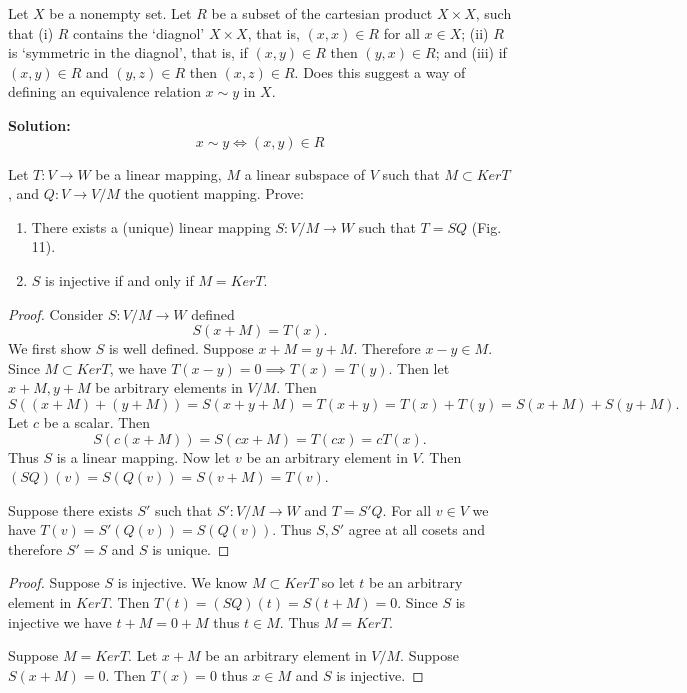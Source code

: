 \begin{tcolorbox}[title=Problem 6, breakable]
    Let $X$ be a nonempty set.
    Let $R$ be a subset of the cartesian product 
    $X \times X$, such that (i) $R$ contains the `diagnol'
    $X \times X$, that is, $(x, x) \in R$ 
    for all $x \in X$; (ii) $R$  is `symmetric in the diagnol',
    that is, if $(x, y) \in R$ then $(y, x) \in R$;
    and (iii) if $(x, y) \in R$ and $(y, z) \in R$ then 
    $(x, z) \in R$. Does this suggest a way of defining an equivalence
    relation $x \sim y$ in $X$.
\end{tcolorbox}

\textbf{Solution: } 
\[x \sim y \iff (x, y) \in R\]

\begin{tcolorbox}[title=Problem 7, breakable]
    Let $T : V \longrightarrow W$ be a linear mapping, $M$ a linear subspace of $V$ such that 
    $M \subset Ker T$, and $Q : V \longrightarrow V/M$ the quotient mapping. Prove:
    \begin{enumerate}
        \item There exists a (unique) linear mapping $S : V/M \longrightarrow W$ such that $T = SQ$ (Fig. 11).
        \item $S$ is injective if and only if $M = Ker T$.
    \end{enumerate}
\end{tcolorbox}

\begin{proof}
    Consider $S : V / M \longrightarrow W$ defined 
    \[
        S(x + M) = T(x).
    \]
    We first show $S$ is well defined. Suppose $x + M = y + M$.
    Therefore $x - y \in M$. Since $M \subset Ker T$,
    we have $T(x - y) = 0 \implies T(x) = T(y)$.
    Then let $x + M, y + M$ be arbitrary elements in $V/M$.
    Then 
    \[
        S((x + M) + (y + M)) = S(x + y + M) = T(x + y)
        = T(x) + T(y) = S(x + M) + S(y + M).
    \]
    Let $c$ be a scalar. Then 
    \[
        S(c(x + M)) = S(cx + M) = T(cx) = cT(x).
    \]
    Thus $S$ is a linear mapping.
    Now let $v$ be an arbitrary element in $V$.
    Then $(SQ)(v) = S(Q(v)) = S(v + M) = T(v)$.
    
    Suppose there exists $S'$ such that $S' : V/M \longrightarrow W$ and $T = S'Q$.
    For all $v \in V$ we have $T(v) = S'(Q(v)) = S(Q(v))$.
    Thus $S, S'$ agree at all cosets and therefore $S' = S$ and $S$ is unique.
\end{proof}

\begin{proof}
    Suppose $S$ is injective.
    We know $M \subset Ker T$ so let $t$ be an arbitrary element in $Ker T$.
    Then $T(t) = (SQ)(t) = S(t + M) = 0$.
    Since $S$ is injective we have $t + M = 0 + M$ thus $t \in M$. Thus $M = Ker T$.

    Suppose $M = Ker T$.
    Let $x + M$ be an arbitrary element in $V / M$.
    Suppose $S(x + M) = 0$.
    Then $T(x) = 0$ thus $x \in M$ and $S$ is injective.
\end{proof}

